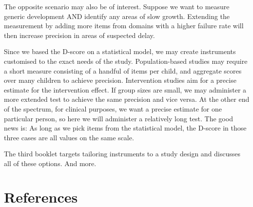 \documentclass[
]{book}
\begin{document}
The opposite scenario may also be of interest. Suppose we want to measure generic development AND identify any areas of slow growth. Extending the measurement by adding more items from domains with a higher failure rate will then increase precision in areas of suspected delay.

Since we based the D-score on a statistical model, we may create instruments customised to the exact needs of the study. Population-based studies may require a short measure consisting of a handful of items per child, and aggregate scores over many children to achieve precision. Intervention studies aim for a precise estimate for the intervention effect. If group sizes are small, we may administer a more extended test to achieve the same precision and vice versa. At the other end of the spectrum, for clinical purposes, we want a precise estimate for one particular person, so here we will administer a relatively long test. The good news is: As long as we pick items from the statistical model, the D-score in those three cases are all values on the same scale.

The third booklet targets tailoring instruments to a study design and discusses all of these options. And more.

\hypertarget{references}{%
\chapter*{References}\label{references}}
\end{document}
